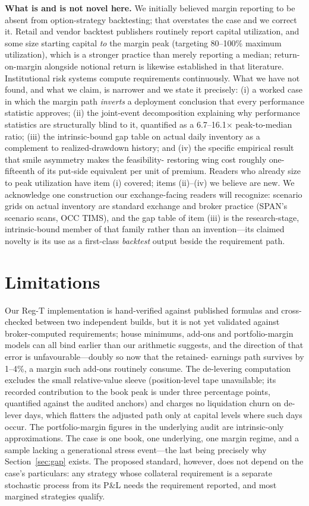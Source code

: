 \documentclass[11pt]{article}
\begin{document}
\textbf{What is and is not novel here.} We initially believed margin reporting to be absent
from option-strategy backtesting; that overstates the case and we correct it. Retail and
vendor backtest publishers routinely report capital utilization, and some size starting capital
\emph{to} the margin peak (targeting 80--100\% maximum utilization), which is a stronger
practice than merely reporting a median; return-on-margin alongside notional return is likewise
established in that literature. Institutional risk systems compute requirements continuously.
What we have not found, and what we claim, is narrower and we state it precisely: (i) a worked
case in which the margin path \emph{inverts} a deployment conclusion that every performance
statistic approves; (ii) the joint-event decomposition explaining why performance statistics are
structurally blind to it, quantified as a 6.7--16.1$\times$ peak-to-median ratio; (iii) the
intrinsic-bound gap table on actual daily inventory as a complement to realized-drawdown
history; and (iv) the specific empirical result that smile asymmetry makes the feasibility-
restoring wing cost roughly one-fifteenth of its put-side equivalent per unit of premium.
Readers who already size
to peak utilization have item (i) covered; items (ii)--(iv) we believe are new. We
acknowledge one construction our exchange-facing readers will recognize: scenario grids on
actual inventory are standard exchange and broker practice (SPAN's scenario scans, OCC TIMS),
and the gap table of item (iii) is the research-stage, intrinsic-bound member of that family
rather than an invention---its claimed novelty is its use as a first-class \emph{backtest}
output beside the requirement path.

\section{Limitations}
Our Reg-T implementation is hand-verified against published formulas and cross-checked between
two independent builds, but it is not yet validated against broker-computed requirements;
house minimums, add-ons and portfolio-margin models can all bind earlier than our arithmetic
suggests, and the direction of that error is unfavourable---doubly so now that the retained-
earnings path survives by 1--4\%, a margin such add-ons routinely consume. The de-levering
computation excludes the small relative-value sleeve (position-level tape unavailable; its
recorded contribution to the book peak is under three percentage points, quantified against the
audited anchors) and charges no liquidation churn on de-lever days, which flatters the adjusted
path only at capital levels where such days occur. The portfolio-margin figures in the
underlying audit are intrinsic-only approximations. The case is one book, one underlying, one
margin regime, and a sample lacking a generational stress event---the last being precisely why
Section~\ref{sec:gap} exists. The proposed standard, however, does not depend on the case's
particulars: any strategy whose collateral requirement is a separate stochastic process from
its P\&L needs the requirement reported, and most margined strategies qualify.
\end{document}

